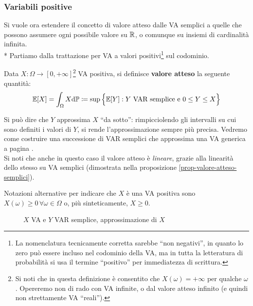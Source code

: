 \subsubsection{Variabili positive}
Si vuole ora estendere il concetto di valore atteso dalle VA semplici a quelle che possono assumere ogni possibile valore su $\mathbb R$, o comunque su insiemi di cardinalità infinita. \\*
Partiamo dalla trattazione per VA a valori positivi\footnote{La nomenclatura tecnicamente corretta sarebbe ``non negativi'', in quanto lo zero può essere incluso nel codominio della VA, ma in tutta la letteratura di probabilità si usa il termine ``positivo'' per immediatezza di scrittura.} sul codominio.
\begin{defn}\label{val-att-VAR-pos}
  Data $X:\Omega \to [0, +\infty]$\footnote{Si noti che in questa definizione è consentito che $X(\omega) = +\infty$ per qualche $\omega$. Opereremo non di rado con VA infinite, o dal valore atteso infinito (e quindi non strettamente VA ``reali'').} VA positiva, si definisce \textbf{valore atteso} la seguente quantità:
  $$\mathbb E[X] = \int_{\Omega} X \mathrm d \mathbb P \coloneqq \sup\Big\{\mathbb E[Y]: Y \text{ VAR semplice e } 0 \leq Y \leq X\Big\}$$
\end{defn}
Si può dire che $Y$ approssima $X$ ``da sotto'': rimpicciolendo gli intervalli su cui sono definiti i valori di $Y$, si rende l'approssimazione sempre più precisa.
Vedremo come costruire una successione di VAR semplici che approssima una VA generica a pagina \pageref{costruzione-VAR-semplice}. \\
Si noti che anche in questo caso il valore atteso è \emph{lineare}, grazie alla linearità dello stesso su VA semplici (dimostrata nella proposizione \ref{prop-valore-atteso-semplici}).
\begin{nb}
	Notazioni alternative per indicare che $X$ è una VA positiva sono $X(\omega) \ge 0 \, \forall \omega \in \Omega$ o, più sinteticamente, $X \ge 0$.
\end{nb}
\begin{figure}[ht]
  \centering
  \label{plot-VAR}
  \caption{$X$ VA e $Y$ VAR semplice, approssimazione di $X$}
\end{figure}

